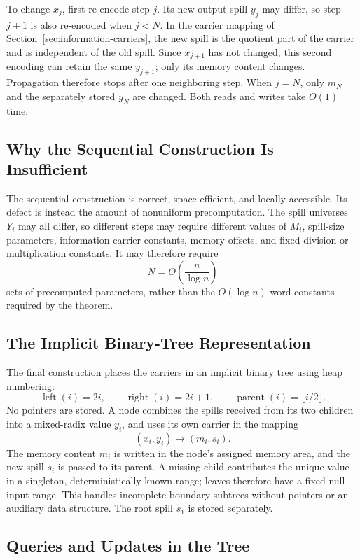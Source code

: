 To change \(x_j\), first re-encode step \(j\). Its new output spill \(y_j\)
may differ, so step \(j+1\) is also re-encoded when \(j<N\). In the carrier
mapping of Section~\ref{sec:information-carriers}, the new spill is the
quotient part of the carrier and is independent of the old spill. Since
\(x_{j+1}\) has not changed, this second encoding can retain the same
\(y_{j+1}\); only its memory content changes. Propagation therefore stops
after one neighboring step. When \(j=N\), only \(m_N\) and the separately
stored \(y_N\) are changed. Both reads and writes take \(O(1)\) time.

\subsection{Why the Sequential Construction Is Insufficient}

The sequential construction is correct, space-efficient, and locally
accessible. Its defect is instead the amount of nonuniform precomputation.
The spill universes \(Y_i\) may all differ, so different steps may require
different values of \(M_i\), spill-size parameters, information carrier
constants, memory offsets, and fixed division or multiplication constants.
It may therefore require
\[
    N=O\left(\frac{n}{\log n}\right)
\]
sets of precomputed parameters, rather than the \(O(\log n)\) word constants
required by the theorem.

\subsection{The Implicit Binary-Tree Representation}

The final construction places the carriers in an implicit binary tree using
heap numbering:
\[
    \operatorname{left}(i)=2i,
    \qquad
    \operatorname{right}(i)=2i+1,
    \qquad
    \operatorname{parent}(i)=\lfloor i/2\rfloor.
\]
No pointers are stored. A node combines the spills received from its two
children into a mixed-radix value \(y_i\), and uses its own carrier in the
mapping
\[
    (x_i,y_i)\longmapsto(m_i,s_i).
\]
The memory content \(m_i\) is written in the node's assigned memory area, and
the new spill \(s_i\) is passed to its parent. A missing child contributes the
unique value in a singleton, deterministically known range; leaves therefore
have a fixed null input range. This handles incomplete boundary subtrees
without pointers or an auxiliary data structure. The root spill \(s_1\) is
stored separately.

\subsection{Queries and Updates in the Tree}

